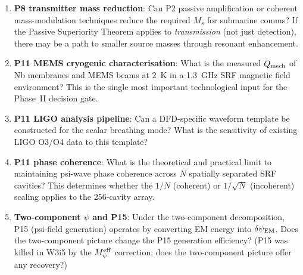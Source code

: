 \documentclass[11pt]{article}
\theoremstyle{definition}
\theoremstyle{remark}
\newcommand{\dpsiEM}{\delta\psi_{\rm EM}}
\newcommand{\Meff}{M_\psi^{\rm eff}}
\begin{document}
\begin{enumerate}
\item \textbf{P8 transmitter mass reduction}: Can P2 passive amplification
  or coherent mass-modulation techniques reduce the required $M_s$ for
  submarine comms? If the Passive Superiority Theorem applies to
  \emph{transmission} (not just detection), there may be a path to
  smaller source masses through resonant enhancement.

\item \textbf{P11 MEMS cryogenic characterisation}: What is the measured
  $Q_{\rm mech}$ of Nb membranes and MEMS beams at 2~K in a 1.3~GHz
  SRF magnetic field environment? This is the single most important
  technological input for the Phase~II decision gate.

\item \textbf{P11 LIGO analysis pipeline}: Can a DFD-specific waveform
  template be constructed for the scalar breathing mode? What is the
  sensitivity of existing LIGO O3/O4 data to this template?

\item \textbf{P11 phase coherence}: What is the theoretical and practical
  limit to maintaining psi-wave phase coherence across $N$ spatially
  separated SRF cavities? This determines whether the $1/N$ (coherent)
  or $1/\sqrt{N}$ (incoherent) scaling applies to the 256-cavity array.

\item \textbf{Two-component $\psi$ and P15}: Under the two-component
  decomposition, P15 (psi-field generation) operates by converting EM
  energy into $\dpsiEM$. Does the two-component picture change the P15
  generation efficiency? (P15 was killed in W3i5 by the $\Meff$ correction;
  does the two-component picture offer any recovery?)
\end{enumerate}
\end{document}
